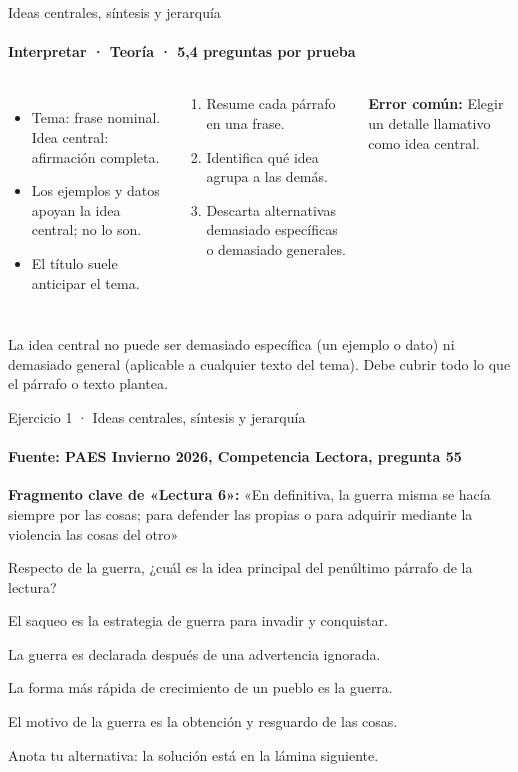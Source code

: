 \documentclass[aspectratio=169,11pt]{beamer}
\newcommand{\alternativa}[2]{\begin{opcion}\tecla{#1}\hspace{0.6em}#2\end{opcion}}
\newlength{\ajustealto}
\newenvironment{ajustar}[1][0.74\textheight]
  {\setlength{\ajustealto}{#1}\begin{lrbox}{\ajustecaja}\begin{minipage}{\textwidth}}
  {\end{minipage}\end{lrbox}%
   \ifdim\dimexpr\ht\ajustecaja+\dp\ajustecaja\relax>\ajustealto
     \resizebox*{!}{\ajustealto}{\usebox{\ajustecaja}}\else\usebox{\ajustecaja}\fi}
\begin{document}
\begin{frame}{Ideas centrales, síntesis y jerarquía}
\label{tema-cl-idea-central}
\framesubtitle{Interpretar · Teoría · 5,4 preguntas por prueba}
\begin{ajustar}
\begin{columns}[T,onlytextwidth]
\begin{itemize}\footnotesize
\item Tema: frase nominal. Idea central: afirmación completa.
\item Los ejemplos y datos apoyan la idea central; no lo son.
\item El título suele anticipar el tema.
\end{itemize}
\begin{cajaregla}\scriptsize \begin{enumerate}\item Resume cada párrafo en una frase.\item Identifica qué idea agrupa a las demás.\item Descarta alternativas demasiado específicas o demasiado generales.\end{enumerate}\end{cajaregla}
\begin{notagris}\scriptsize \textbf{Error común:} Elegir un detalle llamativo como idea central.\end{notagris}
\end{columns}
\begin{cajaclave}\footnotesize
La idea central no puede ser demasiado específica (un ejemplo o dato) ni demasiado general (aplicable a cualquier texto del tema). Debe cubrir todo lo que el párrafo o texto plantea.
\end{cajaclave}
\end{ajustar}
\end{frame}

\begin{frame}{Ejercicio 1 · Ideas centrales, síntesis y jerarquía}
\framesubtitle{Fuente: PAES Invierno 2026, Competencia Lectora, pregunta 55}
\begin{ajustar}[0.7\textheight]
\begin{notagris}\scriptsize \textbf{Fragmento clave de «Lectura 6»:} «En definitiva, la guerra misma se hacía siempre por las cosas; para defender las propias o para adquirir mediante la violencia las cosas del otro»\end{notagris}
{\small Respecto de la guerra, ¿cuál es la idea principal del penúltimo párrafo de la lectura?}
\vspace{0.4em}
\alternativa{A}{El saqueo es la estrategia de guerra para invadir y conquistar.}
\alternativa{B}{La guerra es declarada después de una advertencia ignorada.}
\alternativa{C}{La forma más rápida de crecimiento de un pueblo es la guerra.}
\alternativa{D}{El motivo de la guerra es la obtención y resguardo de las cosas.}
\end{ajustar}
\vfill{\tiny\color{zinc500}\hfill Anota tu alternativa: la solución está en la lámina siguiente.}
\end{frame}
\end{document}
